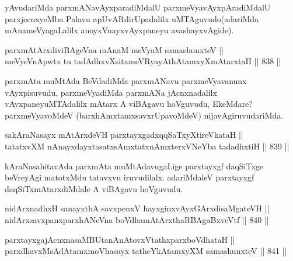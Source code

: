 \begin{artha}
yAvudariMda parxmANavAyxparadiMdalU parxmeVyavAyxpAradiMdalU parxjecnxyeMba Palavu apUvARdirUpadalilx uMTAguvudo(adariMda mAnameVyagaLalilx anoyxVnayxvAyxpaneyu avashayxvAgide).
\end{artha}


\begin{shl}
parxmAtArxdiviBAgeVna mAnaM meVyaM samashunxteV || \\
meVyeVnA\s \s pwtx tu tadAdhxvXsitxmeVRyayAthAtamxyXmAtarxtaH \hfill || 838 ||  
\end{shl}

\begin{artha}
parxmAta muMtAda BeVdadiMda parxmANavu parxmeVyavanunx vAyxpisuvudu, parxmeVyadiMda parxmANa jAcnxnadalilx vAyxpaneyuMTAdalilx mAtarx A viBAgavu hoVguvudu, EkeMdare? parxmeVyavoMdeV (barxhAmxtamxsavxrUpavoMdeV) nijavAgiruvudariMda.
\end{artha}

\begin{shl}
sakAraNasayx mAtArxdeVH parxtayxgadxqqSaTxyXtireVkataH || \\
tatatxvXM nAnayxdayxtasatxsAmxtatxnAmxterxVNeYba tadadhxtiH \hfill || 839 ||  
\end{shl}

\begin{artha}
kAraNasahitavAda parxmAta muMtAdavugaLige parxtayxgf daqSiTxge beVreyAgi matotxMdu tatavxvu iruvudilalx. adariMdaleV parxtayxgf daqSiTxmAtarxdiMdale A viBAgavu hoVguvudu.
\end{artha}


\begin{shl}
nidArxnadhxH sanayxthA savxpenxV hayxginxvAyxGArxdisaMgateVH || \\
nidArxsavxpanxparxhANeVna boVdhamAtArxthaRBAgaBxveVtf \hfill || 840 ||  
\end{shl}
				
\begin{shl}
parxtayxgajAcnxnasaMBUtanAnAtovxVtathxparxboVdhataH || \\
parxdhavxMsAdAtamxmoVhasayx tatheYkAtamxyXM samashunxteV \hfill || 841 ||  
\end{shl}

